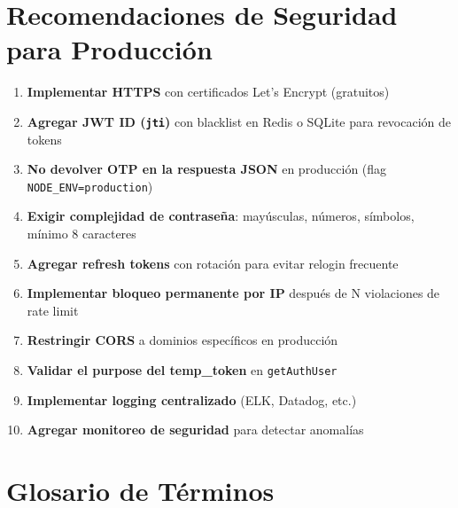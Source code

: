 \documentclass[12pt,a4paper,openany]{article}
\begin{document}
\section{Recomendaciones de Seguridad para Producción}

\begin{enumerate}[leftmargin=*]
    \item \textbf{Implementar HTTPS} con certificados Let's Encrypt (gratuitos)
    \item \textbf{Agregar JWT ID (\texttt{jti})} con blacklist en Redis o SQLite para revocación de tokens
    \item \textbf{No devolver OTP en la respuesta JSON} en producción (flag \texttt{NODE\_ENV=production})
    \item \textbf{Exigir complejidad de contraseña}: mayúsculas, números, símbolos, mínimo 8 caracteres
    \item \textbf{Agregar refresh tokens} con rotación para evitar relogin frecuente
    \item \textbf{Implementar bloqueo permanente por IP} después de N violaciones de rate limit
    \item \textbf{Restringir CORS} a dominios específicos en producción
    \item \textbf{Validar el purpose del temp\_token} en \texttt{getAuthUser}
    \item \textbf{Implementar logging centralizado} (ELK, Datadog, etc.)
    \item \textbf{Agregar monitoreo de seguridad} para detectar anomalías
\end{enumerate}

\section{Glosario de Términos}
\end{document}
